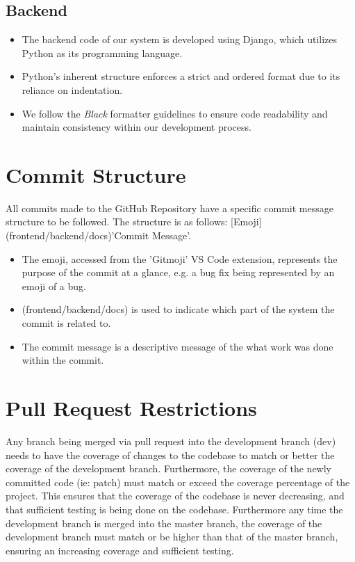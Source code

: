 \documentclass[12pt]{article}
\begin{document}
\subsection{Backend}
\begin{itemize}
    \item The backend code of our system is developed using Django, which utilizes Python as its programming language.
    \item Python's inherent structure enforces a strict and ordered format due to its reliance on indentation.
    \item We follow the \textit{Black} formatter guidelines to ensure code readability and maintain consistency within our development process.
\end{itemize}

\newpage

\section{Commit Structure}
All commits made to the GitHub Repository have a specific commit message structure to be followed. The structure is as follows: [Emoji](frontend/backend/docs)'Commit Message'.
\begin{itemize}
    \item The emoji, accessed from the 'Gitmoji' VS Code extension, represents the purpose of the commit at a glance, e.g. a bug fix being represented by an emoji of a bug.
    \item (frontend/backend/docs) is used to indicate which part of the system the commit is related to.
    \item The commit message is a descriptive message of the what work was done within the commit.
\end{itemize}

\newpage

\section{Pull Request Restrictions}
Any branch being merged via pull request into the development branch (dev) needs to have the coverage of changes to the codebase to match or better the coverage of the development branch. Furthermore, the coverage of the newly committed code (ie: patch) must match or exceed the coverage percentage of the project.
This ensures that the coverage of the codebase is never decreasing, and that sufficient testing is being done on the codebase.
Furthermore any time the development branch is merged into the master branch, the coverage of the development branch must match or be higher than that of the master branch, ensuring an increasing coverage and sufficient testing.
\end{document}
